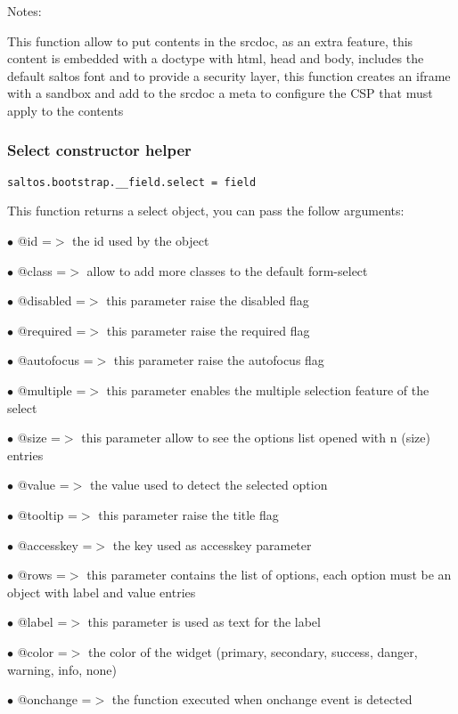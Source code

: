 \documentclass[a4paper]{article}
\begin{document}
Notes:

This function allow to put contents in the srcdoc, as an extra feature, this content is
embedded with a doctype with html, head and body, includes the default saltos font and
to provide a security layer, this function creates an iframe with a sandbox and add to
the srcdoc a meta to configure the CSP that must apply to the contents

\hypertarget{toc621}{}
\subsubsection{Select constructor helper}

\begin{lstlisting}
saltos.bootstrap.__field.select = field
\end{lstlisting}

This function returns a select object, you can pass the follow arguments:

\begin{compactitem}
\item[\color{myblue}$\bullet$] @id        =$>$ the id used by the object
\item[\color{myblue}$\bullet$] @class     =$>$ allow to add more classes to the default form-select
\item[\color{myblue}$\bullet$] @disabled  =$>$ this parameter raise the disabled flag
\item[\color{myblue}$\bullet$] @required  =$>$ this parameter raise the required flag
\item[\color{myblue}$\bullet$] @autofocus =$>$ this parameter raise the autofocus flag
\item[\color{myblue}$\bullet$] @multiple  =$>$ this parameter enables the multiple selection feature of the select
\item[\color{myblue}$\bullet$] @size      =$>$ this parameter allow to see the options list opened with n (size) entries
\item[\color{myblue}$\bullet$] @value     =$>$ the value used to detect the selected option
\item[\color{myblue}$\bullet$] @tooltip   =$>$ this parameter raise the title flag
\item[\color{myblue}$\bullet$] @accesskey =$>$ the key used as accesskey parameter
\item[\color{myblue}$\bullet$] @rows      =$>$ this parameter contains the list of options, each option must be an object
              with label and value entries
\item[\color{myblue}$\bullet$] @label     =$>$ this parameter is used as text for the label
\item[\color{myblue}$\bullet$] @color     =$>$ the color of the widget (primary, secondary, success, danger, warning, info, none)
\item[\color{myblue}$\bullet$] @onchange  =$>$ the function executed when onchange event is detected
\end{compactitem}
\end{document}
